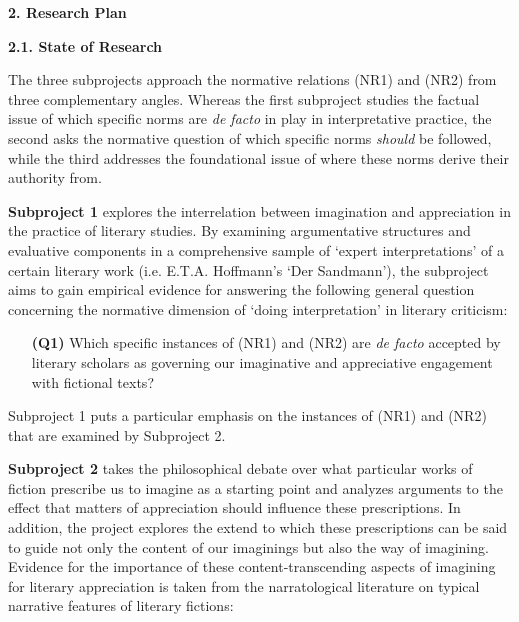\noindent\textbf{\large 2.  Research Plan}

\noindent\textbf{2.1.  State of Research}

\noindent The three subprojects approach the normative relations (NR1) and (NR2) from three complementary angles. Whereas the first subproject studies the factual issue of which specific norms are \emph{de facto} in play in interpretative practice, the second asks the normative question of which specific norms \emph{should} be followed, while the third addresses the foundational issue of where these norms derive their authority from.

\vspace{.2cm}
\noindent\textbf{Subproject 1} explores the interrelation between imagination and appreciation in the practice of literary studies. By examining argumentative structures and evaluative components in a comprehensive sample of `expert interpretations' of a certain literary work (i.e. E.T.A. Hoffmann's `Der Sandmann'), the subproject aims to gain empirical evidence for answering the following general question concerning the normative dimension of `doing interpretation' in literary criticism:

\vspace{-.1cm}
\begin{itemize}[leftmargin=2cm]
\item[\textbf{(Q1)}] Which specific instances of (NR1) and (NR2) are \emph{de facto} accepted by literary scholars as governing our imaginative and appreciative engagement with fictional texts?
\end{itemize}
\vspace{-.1cm}

\noindent Subproject 1 puts a particular emphasis on the instances of (NR1) and (NR2) that are examined by Subproject 2.

\vspace{.2cm}
\noindent\textbf{Subproject 2} takes the philosophical debate over what particular works of fiction prescribe us to imagine as a starting point and analyzes arguments to the effect that matters of appreciation should influence these prescriptions. In addition, the project explores the extend to which these prescriptions can be said to guide not only the content of our imaginings but also the way of imagining. Evidence for the importance of these content-transcending aspects of imagining for literary appreciation is taken from the narratological literature on typical narrative features of literary fictions:


